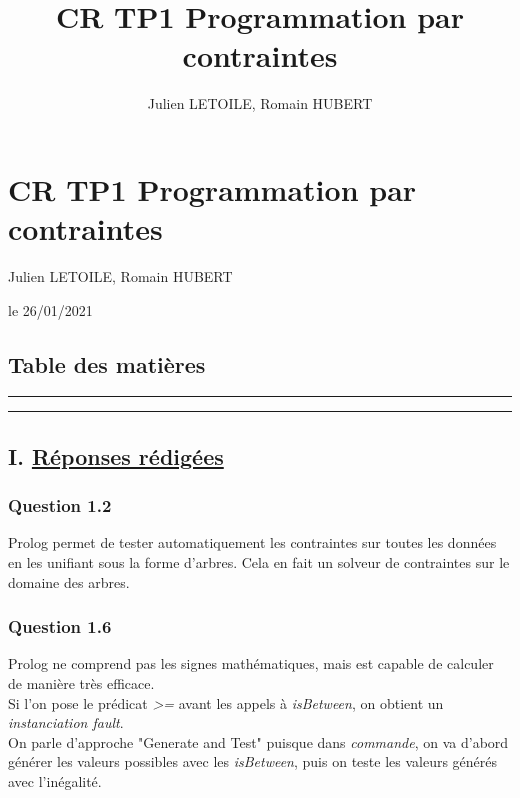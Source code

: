 \documentclass[
]{article}
\title{CR TP1 Programmation par contraintes}
\author{Julien LETOILE, Romain HUBERT}
\date{}
\begin{document}
\maketitle

\hypertarget{header-n3}{%
\section{\texorpdfstring{CR TP1 Programmation par contraintes
}{CR TP1 Programmation par contraintes }}\label{header-n3}}

Julien LETOILE, Romain HUBERT

le 26/01/2021

\hypertarget{header-n16}{%
\subsection{Table des matières}\label{header-n16}}

\begin{center}\rule{0.5\linewidth}{0.5pt}\end{center}

\tableofcontents

\begin{center}\rule{0.5\linewidth}{0.5pt}\end{center}

\hypertarget{header-n21}{%
\subsection{\texorpdfstring{I. \underline{Réponses
rédigées}}{I. Réponses rédigées}}\label{header-n21}}

\hypertarget{header-n22}{%
\subsubsection{Question 1.2}\label{header-n22}}

Prolog permet de tester automatiquement les contraintes sur toutes les
données en les unifiant sous la forme d'arbres. Cela en fait un solveur
de contraintes sur le domaine des arbres.

\hypertarget{header-n24}{%
\subsubsection{Question 1.6}\label{header-n24}}

Prolog ne comprend pas les signes mathématiques, mais est capable de
calculer de manière très efficace.\\
Si l'on pose le prédicat \emph{\textgreater=} avant les appels à
\emph{isBetween}, on obtient un \emph{instanciation fault}.\\
On parle d'approche "Generate and Test" puisque dans \emph{commande}, on
va d'abord générer les valeurs possibles avec les \emph{isBetween}, puis
on teste les valeurs générés avec l'inégalité.
\end{document}
